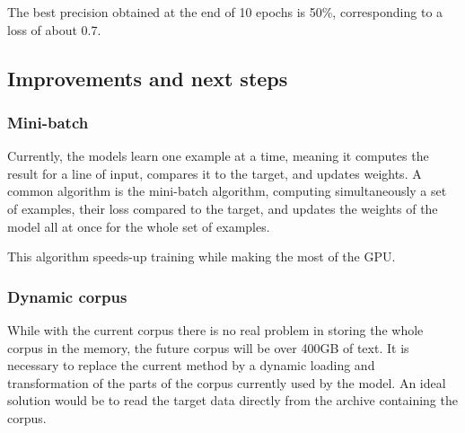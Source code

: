 The best precision obtained at the end of 10 epochs is 50\%,
corresponding to a loss of about 0.7.

\subsection{Improvements and next
steps}

\subsubsection{Mini-batch}

Currently, the models learn one example at a time, meaning it computes
the result for a line of input, compares it to the target, and updates
weights. A common algorithm is the mini-batch algorithm, computing
simultaneously a set of examples, their loss compared to the target, and
updates the weights of the model all at once for the whole set of
examples.

This algorithm speeds-up training while making the most of the GPU.

\subsubsection{Dynamic corpus}

While with the current corpus there is no real problem in storing the
whole corpus in the memory, the future corpus will be over 400GB of
text. It is necessary to replace the current method by a dynamic loading
and transformation of the parts of the corpus currently used by the
model. An ideal solution would be to read the target data directly from
the archive containing the corpus.
